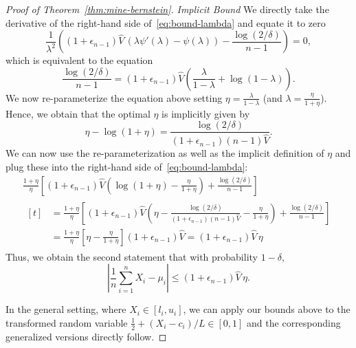 \documentclass[aos]{imsart2}
\theoremstyle{plain}
\theoremstyle{definition}
\newcommand{\vh}{\hat{V}}
\begin{document}
\begin{appendix}
\begin{proof}[Proof of Theorem~\ref{thm:mine-bernstein}]
    \textit{Implicit Bound} We directly take the derivative of the right-hand side of~\eqref{eq:bound-lambda} and equate it to zero
    \begin{equation*}
        \frac{1}{\lambda^2}\left((1+\epsilon_{n-1})\vh\, (\lambda \psi'(\lambda)-\psi(\lambda))-\frac{\log(2/\delta)}{n-1}\right) = 0,
    \end{equation*}
    which is equivalent to the equation
    \begin{equation*}
        \frac{\log(2/\delta)}{n-1} =  (1+\epsilon_{n-1})\vh \left(\frac{\lambda}{1-\lambda}+\log(1-\lambda)\right).
    \end{equation*}
    We now re-parameterize the equation above setting $\eta = \frac{\lambda}{1-\lambda}$ (and $\lambda = \frac{\eta}{1+\eta}$). Hence, we obtain that the optimal $\eta$ is implicitly given by
    \begin{equation*}
        \eta - \log(1+\eta) = \frac{\log(2/\delta)}{(1+\epsilon_{n-1})(n-1)\vh}.
    \end{equation*}
    We can now use the re-parameterization as well as the implicit definition of $\eta$ and plug these into the right-hand side of~\eqref{eq:bound-lambda}:
    \begin{multline*}
        \frac{1+\eta}{\eta} \left[(1+\epsilon_{n-1})\vh\left(\log(1+\eta)-\frac{\eta}{1+\eta}\right)+\frac{\log(2/\delta)}{n-1}\right]\\
        \begin{aligned}[t]
            &= \frac{1+\eta}{\eta} \left[(1+\epsilon_{n-1})\vh\left(\eta-\frac{\log(2/\delta)}{(1+\epsilon_{n-1})(n-1)\vh}-\frac{\eta}{1+\eta}\right)+\frac{\log(2/\delta)}{n-1}\right]\\
            &= \frac{1+\eta}{\eta} \left[\eta - \frac{\eta}{1+\eta}\right] (1+\epsilon_{n-1})\vh = (1+\epsilon_{n-1})\vh\, \eta
        \end{aligned}
    \end{multline*}
    Thus, we obtain the second statement that with probability $1-\delta$,
    \begin{equation*}
        \left\vert\frac{1}{n}\sum_{i=1}^n X_i - \mu_i\right\vert \leq (1+\epsilon_{n-1})\vh\, \eta.
    \end{equation*}

    In the general setting, where $X_i \in [l_i,u_i]$, we can apply our bounds above to the transformed random variable $\frac{1}{2}+(X_i-c_i)/L \in [0,1]$ and the corresponding generalized versions directly follow.
\end{proof}



\end{appendix}
\end{document}
